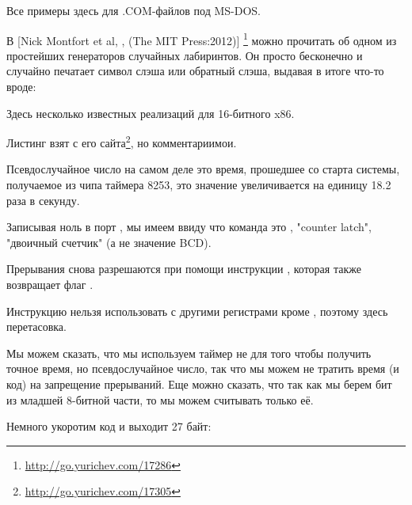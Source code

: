 
Все примеры здесь для .COM-файлов под MS-DOS.

В [Nick Montfort et al, , (The MIT Press:2012)]
\footnote{\AlsoAvailableAs \url{http://go.yurichev.com/17286}}
можно прочитать об одном из простейших генераторов случайных лабиринтов.
Он просто бесконечно и случайно печатает символ слэша или обратный слэша, выдавая в итоге что-то вроде:

\begin{figure}[H]
\centering
{}
\end{figure}

Здесь несколько известных реализаций для 16-битного x86.


\newcommand{\FNURLTRIXTER}{\footnote{\url{http://go.yurichev.com/17305}}}

Листинг взят с его сайта\FNURLTRIXTER, но комментарии\EMDASH{}мои.



Псевдослучайное число на самом деле это время, прошедшее со старта системы, получаемое из чипа таймера 8253, 
это значение
увеличивается на единицу 18.2 раза в секунду.

Записывая ноль в порт , 
мы имеем ввиду что команда это , 
"counter latch", 
"двоичный счетчик" (а не значение \ac{BCD}).

Прерывания снова разрешаются при помощи инструкции , которая
также возвращает флаг .

Инструкцию  нельзя использовать с другими регистрами кроме , поэтому здесь перетасовка.


Мы можем сказать, что мы используем таймер не для того чтобы получить точное время, но псевдослучайное число,
так что мы можем не тратить время (и код) на запрещение прерываний.
Еще можно сказать, что так как мы берем бит из младшей 8-битной части, то мы можем считывать только её.

Немного укоротим код и выходит 27 байт:

